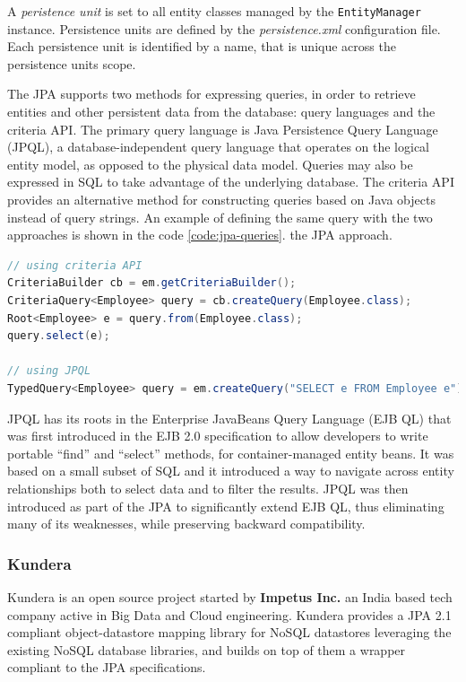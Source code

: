 \noindent A \textit{peristence unit} is set to all entity classes managed by the \texttt{EntityManager} instance.
Persistence units are defined by the \textit{persistence.xml} configuration file. Each persistence unit is identified by a name, that is unique across the persistence units scope. 

\newparagraph The JPA supports two methods for expressing queries, in order to retrieve entities and other persistent data from the database: query languages and the criteria API. The primary query language is Java Persistence Query Language (JPQL), a database-independent query language that operates on the logical entity model, as opposed to the physical data model. Queries may also be expressed in SQL to take advantage of the underlying database. The criteria API provides an alternative method for constructing queries based on Java objects instead of query strings.
An example of defining the same query with the two approaches is shown in the code \ref{code:jpa-queries}.
the JPA approach.

\begin{lstlisting}[language=Java, caption=Create queries with JPA, label=code:jpa-queries]
// using criteria API
CriteriaBuilder cb = em.getCriteriaBuilder();
CriteriaQuery<Employee> query = cb.createQuery(Employee.class);
Root<Employee> e = query.from(Employee.class);
query.select(e);
  
// using JPQL
TypedQuery<Employee> query = em.createQuery("SELECT e FROM Employee e");
\end{lstlisting}

\noindent JPQL has its roots in the Enterprise JavaBeans Query Language (EJB QL) that was first introduced in the EJB 2.0 specification to allow developers to write portable ``find'' and ``select'' methods, for container-managed entity beans. It was based on a small subset of SQL and it introduced a way to navigate across entity relationships both to select data and to filter the results.
JPQL was then introduced as part of the JPA to significantly extend EJB QL, thus eliminating many of its weaknesses, while preserving backward compatibility.

\subsubsection{Kundera}
Kundera is an open source project started by \textbf{Impetus Inc.} an India based tech company active in Big Data and Cloud engineering.
Kundera provides a JPA 2.1 compliant object-datastore mapping library for NoSQL datastores leveraging the existing NoSQL database libraries, and builds on top of them a wrapper compliant to the JPA specifications.

